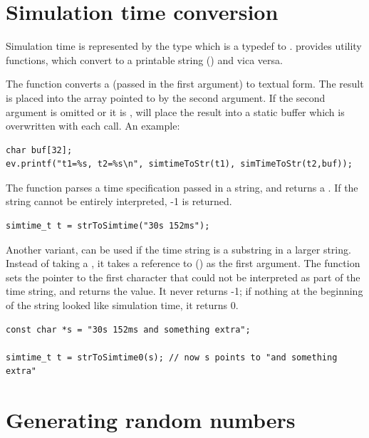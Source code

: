 

\section{Simulation time conversion}

Simulation time is represented by the type 
which is a typedef to .
{\opp} provides utility functions, which convert 
to a printable string () and vica versa.

The  function converts a 
(passed in the first argument) to textual form. The result is placed into
the  array pointed to by the second argument. If the second argument is omitted
or it is ,  will place the result into a
static buffer which is overwritten with each call. An example:

\begin{verbatim}
char buf[32];
ev.printf("t1=%s, t2=%s\n", simtimeToStr(t1), simTimeToStr(t2,buf));
\end{verbatim}

The  function parses a time specification passed
in a string, and returns a . If the string cannot
be entirely interpreted, -1 is returned.

\begin{verbatim}
simtime_t t = strToSimtime("30s 152ms");
\end{verbatim}

Another variant,  can be used if the time
string is a substring in a larger string. Instead of taking a ,
it takes a reference to  () as the first argument.  The
function sets the pointer to the first character that could not be
interpreted as part of the time string, and returns the value. It
never returns -1; if nothing at the beginning of the string looked
like simulation time, it returns 0.

\begin{verbatim}
const char *s = "30s 152ms and something extra";

simtime_t t = strToSimtime0(s); // now s points to "and something extra"
\end{verbatim}


\section{Generating random numbers}
\label{cha:sim-lib:generating-random-numbers}

